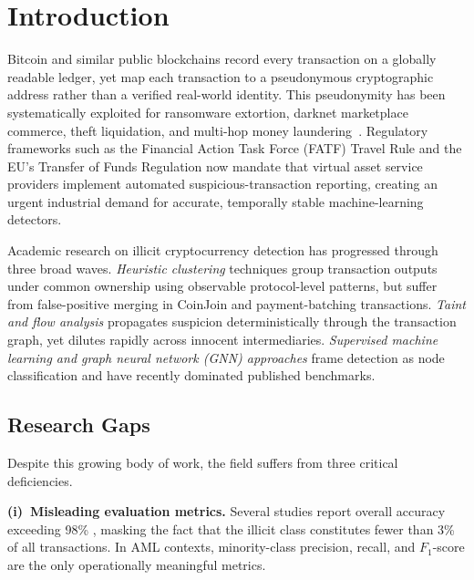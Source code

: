 \documentclass[conference]{IEEEtran}
\begin{document}
\section{Introduction}
\label{sec:intro}

Bitcoin and similar public blockchains record every transaction on a
globally readable ledger, yet map each transaction to a pseudonymous
cryptographic address rather than a verified real-world identity.
This pseudonymity has been systematically exploited for ransomware extortion,
darknet marketplace commerce, theft liquidation, and multi-hop money
laundering~\cite{tironsakkul2019probing, harrigan2016unreasonable}.
Regulatory frameworks such as the Financial Action Task Force (FATF)
Travel Rule and the EU's Transfer of Funds Regulation now mandate that
virtual asset service providers implement automated suspicious-transaction
reporting, creating an urgent industrial demand for accurate, temporally
stable machine-learning detectors.

Academic research on illicit cryptocurrency detection has progressed
through three broad waves.
\textit{Heuristic clustering} techniques
\cite{harrigan2016unreasonable, he2022bitcoin, schnoering2024assessing}
group transaction outputs under common ownership using observable
protocol-level patterns, but suffer from false-positive merging in
CoinJoin and payment-batching transactions.
\textit{Taint and flow analysis}
\cite{tironsakkul2019probing, tironsakkul2020tracking, hercog2019taint}
propagates suspicion deterministically through the transaction graph,
yet dilutes rapidly across innocent intermediaries.
\textit{Supervised machine learning and graph neural network (GNN)
approaches}
\cite{weber2019anti, nerurkar2020detecting, guo2023lb,
nicholls2023fraudlens, lin2026wavelet, han2026featuregated}
frame detection as node classification and have recently dominated
published benchmarks.

\subsection{Research Gaps}

Despite this growing body of work, the field suffers from three critical
deficiencies.

\smallskip
\noindent\textbf{(i)~Misleading evaluation metrics.}
Several studies report overall accuracy exceeding 98\%
\cite{asiri2025graph}, masking the fact that the illicit class constitutes
fewer than 3\% of all transactions.
In AML contexts, minority-class precision, recall, and $F_1$-score are
the only operationally meaningful metrics.
\end{document}
